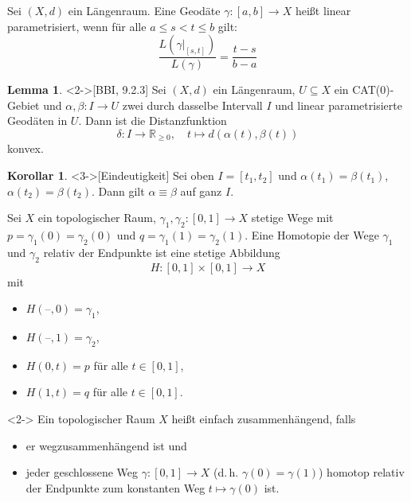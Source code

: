 \documentclass{beamer}
\newcommand{\R}{\mathbb{R}} %
\newcommand{\I}{\left[0,1\right]} %
\renewcommand{\emph}[1]{\textcolor{Emph}{#1}}
\newcommand{\blank}{\text{--}}
\theoremstyle{definition}
\newtheorem*{lem}{Lemma}
\newtheorem*{kor}{Korollar}
\begin{document}
\begin{frame}
  \begin{definition}
    Sei $(X, d)$ ein Längenraum. Eine Geodäte $\gamma : \left[a, b\right] \to X$ heißt \emph{linear parametrisiert}, wenn für alle $a \leq s < t \leq b$ gilt:
    \[ \frac{L(\gamma|_{\left[s,t\right]})}{L(\gamma)} = \frac{t-s}{b-a} \]
  \end{definition}

  \begin{lem}<2->[BBI, 9.2.3]
    Sei $(X, d)$ ein Längenraum, $U \subseteq X$ ein CAT($0$)-Gebiet und $\alpha, \beta : I \to U$ zwei durch dasselbe Intervall $I$ und linear parametrisierte Geodäten in $U$. Dann ist die Distanzfunktion
    \[ \delta : I \to \R_{\geq 0}, \quad t \mapsto d(\alpha(t), \beta(t)) \]
    konvex.
  \end{lem}

  \begin{kor}<3->[Eindeutigkeit]
    Sei oben $I = \left[t_1, t_2\right]$ und $\alpha(t_1) = \beta(t_1)$, $\alpha(t_2) = \beta(t_2)$. Dann gilt $\alpha \equiv \beta$ auf ganz $I$.
  \end{kor}
\end{frame}

\begin{frame}
  \begin{definition}
    Sei $X$ ein topologischer Raum, $\gamma_1, \gamma_2 : \left[ 0, 1 \right] \to X$ stetige Wege mit $p = \gamma_1(0) = \gamma_2(0)$ und $q = \gamma_1(1) = \gamma_2(1)$. Eine \emph{Homotopie} der Wege $\gamma_1$ und $\gamma_2$ \emph{relativ der Endpunkte} ist eine stetige Abbildung
    \[ H : \I \times \I \to X \]
    mit
    \begin{itemize}
      \item $H(\blank, 0) = \gamma_1$,
      \item $H(\blank, 1) = \gamma_2$,
      \item $H(0, t) = p$ für alle $t \in \I$,
      \item $H(1, t) = q$ für alle $t \in \I$.
    \end{itemize}
  \end{definition}

  \begin{definition}<2->
    Ein topologischer Raum $X$ heißt \emph{einfach zusammenhängend}, falls
    \begin{itemize}
      \item er wegzusammenhängend ist und
      \item jeder geschlossene Weg $\gamma : \I \to X$ (d.\,h. $\gamma(0) = \gamma(1)$) homotop relativ der Endpunkte zum konstanten Weg $t \mapsto \gamma(0)$ ist.
    \end{itemize}
  \end{definition}
\end{frame}
\end{document}
